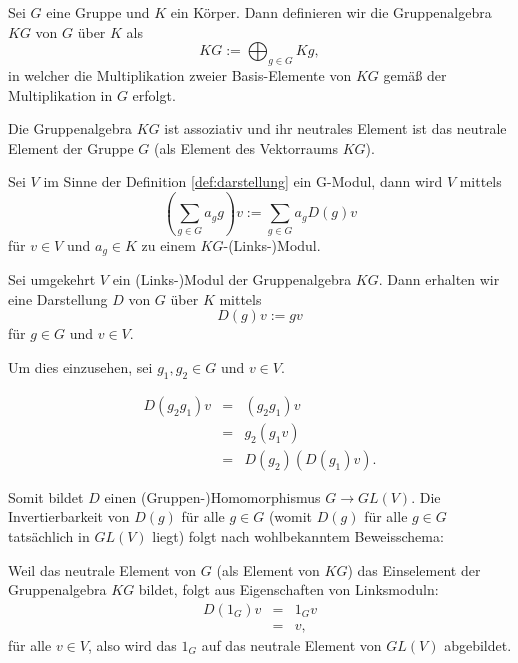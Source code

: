 \documentclass[10p,a4paper,BCOR = 12mm, DIV=15]{scrbook}
\begin{document}
\begin{Def}
Sei $G$ eine Gruppe und $K$ ein Körper. Dann definieren wir die Gruppenalgebra $K G$ von $G$ über $K$ als
\begin{displaymath}
K G := \bigoplus_{g \in G} K g,
\end{displaymath}
in welcher die Multiplikation zweier Basis-Elemente von $K G$ gemäß der Multiplikation in $G$ erfolgt.
\end{Def}

\begin{Bem}
Die Gruppenalgebra $K G$ ist assoziativ und ihr neutrales Element ist das neutrale Element der Gruppe $G$ (als Element des Vektorraums $K G$).
\end{Bem}

\begin{Bem}
\label{bem:aequivalenz_darstellung_modul}
Sei $V$ im Sinne der Definition \ref{def:darstellung} ein G-Modul, dann wird $V$ mittels
\begin{displaymath}
\left(\sum_{g \in G} a_g g\right) v := \sum_{g \in G} a_g D\left(g\right) v
\end{displaymath}
für $v \in V$ und $a_g \in K$ zu einem $K G$-(Links-)Modul.

Sei umgekehrt $V$ ein (Links-)Modul der Gruppenalgebra $K G$. Dann erhalten wir eine Darstellung $D$ von $G$ über $K$ mittels
\begin{displaymath}
D\left(g\right) v := g v
\end{displaymath}
für $g \in G$ und $v \in V$. 

Um dies einzusehen, sei $g_1, g_2 \in G$ und $v \in V$.

\begin{eqnarray*}
D \left(g_2 g_1\right) v & = & \left(g_2 g_1\right) v \\
& = & g_2 \left(g_1 v\right) \\
& = & D\left(g_2\right) \left(D\left(g_1\right) v\right).
\end{eqnarray*}

Somit bildet $D$ einen (Gruppen-)Homomorphismus $G \rightarrow GL\left(V\right)$. Die Invertierbarkeit von $D\left(g\right)$ für alle $g \in G$ (womit $D\left(g\right)$ für alle $g \in G$ tatsächlich in $GL\left(V\right)$ liegt) folgt nach wohlbekanntem Beweisschema:

Weil das neutrale Element von $G$ (als Element von $K G$) das Einselement der Gruppenalgebra $K G$ bildet, folgt aus Eigenschaften von Linksmoduln:
\begin{eqnarray*}
D\left(1_G\right) v & = & 1_G v \\
& = & v,
\end{eqnarray*}
für alle $v \in V$, also wird das $1_G$ auf das neutrale Element von $GL\left(V\right)$ abgebildet.


\end{Bem}
\end{document}
